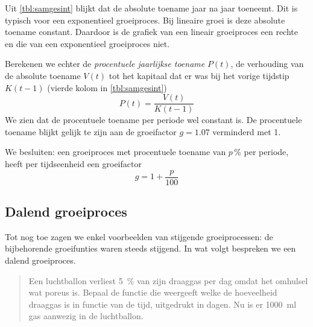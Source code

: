Uit \cref{tbl:samgesint}  blijkt dat de absolute toename jaar na jaar toeneemt. Dit is typisch voor een exponentieel groeiproces. 
 Bij lineaire groei is deze absolute toename constant. Daardoor is de grafiek van een lineair groeiproces een rechte en die van een exponentieel groeiproces niet.
 
 Berekenen we echter de
 \emph{procentuele jaarlijkse toename} $P(t)$,  de verhouding van de
 absolute toename $V(t)$ tot het kapitaal dat er was bij het vorige tijdstip $K(t-1)$ (vierde kolom in \cref{tbl:samgesint})
 \begin{displaymath}
     P(t)=\frac{V(t)}{K(t-1)}
 \end{displaymath}
We zien dat de procentuele toename per periode wel
constant is. De procentuele toename blijkt gelijk te zijn aan de groeifactor $g=\num{1.07}$ verminderd met 1.

We besluiten: een groeiproces met procentuele toename van $p$\,\%
per periode, heeft per tijdseenheid een groeifactor 
\begin{equation}
g=1+\frac{p}{100}
\label{eq:groeifactor_procent}
\end{equation}

\subsection{Dalend groeiproces}\label{subsec.ballon}
Tot nog toe zagen we enkel voorbeelden van stijgende groeiprocessen: de bijbehorende groeifunties waren steeds stijgend. In wat volgt bespreken we een dalend groeiproces.
\begin{quote}
    Een luchtballon verliest  \SI{5}{\percent} van zijn
    draaggas per dag omdat het omhulsel wat poreus is. Bepaal de functie die weergeeft welke de hoeveelheid draaggas is in functie van de tijd, uitgedrukt in dagen. Nu is er \SI{1000}{\milli\litre} gas aanwezig in de luchtballon.
\end{quote}


